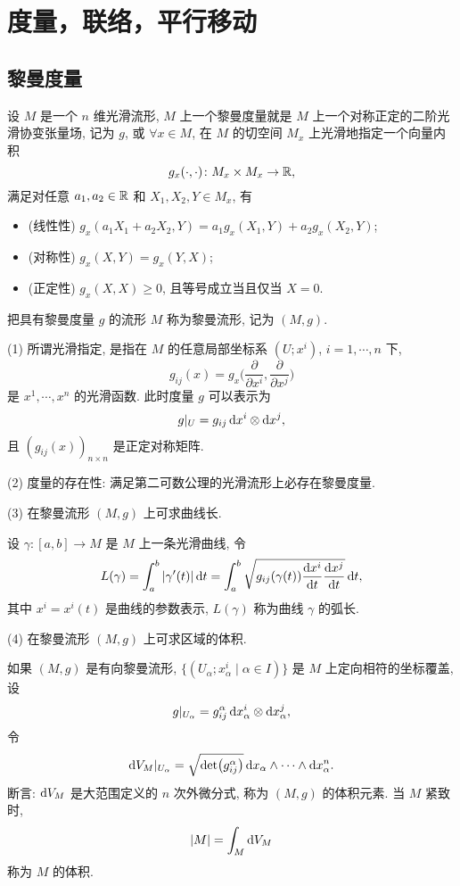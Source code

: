 \chapter{度量，联络，平行移动}



\section{黎曼度量}



\begin{definition}
  设 $M$ 是一个 $n$ 维光滑流形, $M$ 上一个黎曼度量就是 $M$ 上一个对称正定的二阶光滑协变张量场,
  记为 $g$, 或 $\forall x\in M$, 在 $M$ 的切空间 $M_x$ 上光滑地指定一个向量内积
  \[g_x(\cdot,\cdot)\colon M_x\times M_x\to\mathbb{R},\]
  满足对任意 $a_1,a_2\in\mathbb{R}$ 和 $X_1,X_2,Y\in M_x$, 有
  \begin{itemize}
    \item (线性性) $g_x(a_1X_1 + a_2X_2, Y) = a_1g_x(X_1,Y) + a_2g_x(X_2,Y)$;
    \item (对称性) $g_x(X,Y) = g_x(Y,X)$;
    \item (正定性) $g_x(X,X)\geq 0$, 且等号成立当且仅当 $X=0$.
  \end{itemize}
  把具有黎曼度量 $g$ 的流形 $M$ 称为黎曼流形, 记为 $(M,g)$.
\end{definition}


\begin{remark}
  (1) 所谓光滑指定, 是指在 $M$ 的任意局部坐标系 $(U;x^i)$, $i=1,\cdots,n$ 下,
  \[g_{ij}(x) = g_x\biggl(\frac{\partial}{\partial x^i}, \frac{\partial}{\partial x^j}\biggr)\]
  是 $x^1,\cdots,x^n$ 的光滑函数. 此时度量 $g$ 可以表示为
  \[g|_U = g_{ij}\mathop{}\!\mathrm{d} x^i\otimes\mathop{}\!\mathrm{d} x^j,\]
  且 $(g_{ij}(x))_{n\times n}$ 是正定对称矩阵.

  (2) 度量的存在性: 满足第二可数公理的光滑流形上必存在黎曼度量.

  (3) 在黎曼流形 $(M,g)$ 上可求曲线长.

  设 $\gamma: [a,b]\to M$ 是 $M$ 上一条光滑曲线, 令
  \[L(\gamma) = \int_a^b |\gamma'(t)|\mathop{}\!\mathrm{d} t
    = \int_a^b \sqrt{g_{ij}(\gamma(t))\frac{\mathop{}\!\mathrm{d} x^i}{\mathop{}\!\mathrm{d} t}\frac{\mathop{}\!\mathrm{d} x^j}{\mathop{}\!\mathrm{d} t}}\mathop{}\!\mathrm{d} t,\]
  其中 $x^i=x^i(t)$ 是曲线的参数表示, $L(\gamma)$ 称为曲线 $\gamma$ 的弧长.

  (4) 在黎曼流形 $(M,g)$ 上可求区域的体积.

  如果 $(M,g)$ 是有向黎曼流形, $\{(U_{\alpha}; x_{\alpha}^i\mid \alpha\in I)\}$
  是 $M$ 上定向相符的坐标覆盖, 设
  \[g|_{U_{\alpha}} = g_{ij}^{\alpha}\mathop{}\!\mathrm{d} x_{\alpha}^i\otimes\mathop{}\!\mathrm{d} x_{\alpha}^j,\]
  令
  \[\mathop{}\!\mathrm{d} V_M|_{U_{\alpha}} = \sqrt{\det\bigl(g_{ij}^{\alpha}\bigr)}
    \mathop{}\!\mathrm{d} x_{\alpha}\wedge\cdots\wedge\mathop{}\!\mathrm{d} x_{\alpha}^n.\]
  断言: $\mathop{}\!\mathrm{d} V_M$ 是大范围定义的 $n$ 次外微分式, 称为 $(M,g)$ 的体积元素. 当 $M$ 紧致时,
  \[|M| = \int_M \mathop{}\!\mathrm{d} V_M\]
  称为 $M$ 的体积.
\end{remark}



